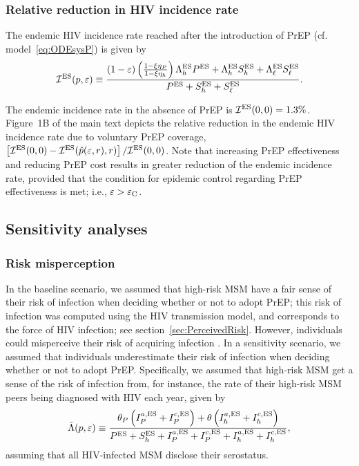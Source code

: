 \documentclass[12pt]{article}
\begin{document}
 
\subsubsection{Relative reduction in HIV incidence rate}

The endemic HIV incidence rate reached after the introduction of PrEP (cf. model~\eqref{eq:ODEsysP}) is given by
\begin{equation}
	\mathcal{I}^{\rm ES}(p, \varepsilon) \equiv \frac{(1-\varepsilon) \left(\frac{1-\xi \eta_P}{1-\xi \eta_h}\right) \Lambda_h^{\rm ES} P^{\rm ES} + \Lambda_h^{\rm ES} S_h^{\rm ES} + \Lambda_\ell^{\rm ES} S_\ell^{\rm ES}}{P^{\rm ES} + S_h^{\rm ES} + S_\ell^{\rm ES}}.
\end{equation}

The endemic incidence rate in the absence of PrEP is $\mathcal{I}^{\rm ES}(0, 0) = 1.3\%$. Figure~1B of the main text depicts the relative reduction in the endemic HIV incidence rate due to voluntary PrEP coverage, $ \left[\mathcal{I}^{\rm ES}(0, 0) - \mathcal{I}^{\rm ES}(\hat{p}(\varepsilon,r),r) \right]/\mathcal{I}^{\rm ES}(0, 0)$. Note that increasing PrEP effectiveness and reducing PrEP cost results in greater reduction of the endemic incidence rate, provided that the condition for epidemic control regarding PrEP effectiveness is met; i.e., $\varepsilon > \varepsilon_{\rm C}$.


\subsection{Sensitivity analyses}
\subsubsection{Risk misperception}

In the baseline scenario, we assumed that high-risk MSM have a fair sense of their risk of infection when deciding whether or not to adopt PrEP; this risk of infection was computed using the HIV transmission model, and corresponds to the force of HIV infection; see section~\ref{sec:PerceivedRisk}. However, individuals could misperceive their risk of acquiring infection \cite{Blumenthal2019}.  In a sensitivity scenario, we assumed that individuals underestimate their risk of infection when deciding whether or not to adopt PrEP. Specifically, we assumed that high-risk MSM get a sense of the risk of infection from, for instance, the rate of their high-risk MSM peers being diagnosed with HIV each year, given by
\begin{equation}
	\tilde{\Lambda} (p, \varepsilon) \equiv \frac{\theta_P \left(I_P^{a,\rm ES} + I_P^{c,\rm ES}\right) + \theta \left(I_h^{a,\rm ES} + I_h^{c,\rm ES}\right)}{P^{\rm ES} + S_h^{\rm ES} + I_P^{a,\rm ES} + I_P^{c,\rm ES} + I_h^{a,\rm ES} + I_h^{c,\rm ES}} ,
\end{equation}
{assuming that all HIV-infected MSM disclose their serostatus}.
\end{document}
